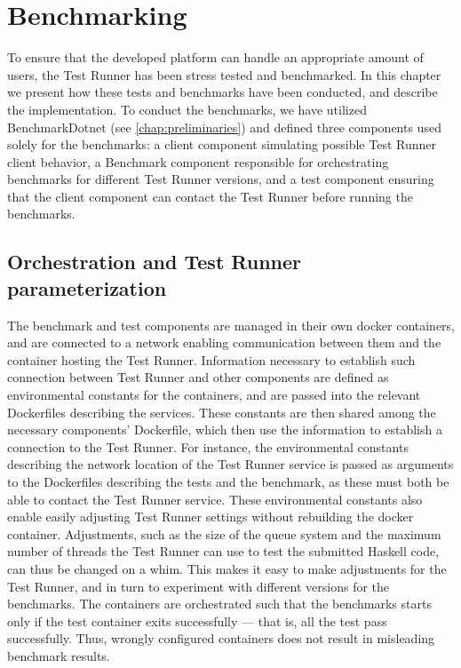 \chapter{Benchmarking} \label{chap:Benchmarking}
To ensure that the developed platform can handle an appropriate amount of users, the Test Runner has been stress tested and benchmarked.
In this chapter we present how these tests and benchmarks have been conducted, and describe the implementation. To conduct the benchmarks, we have utilized BenchmarkDotnet (see \ref{chap:preliminaries}) and defined three components used solely for the benchmarks:
a client component simulating possible Test Runner client behavior, a Benchmark component responsible for orchestrating benchmarks for different Test Runner versions, and a test component ensuring that the client component can contact the Test Runner before running the benchmarks.

\section{Orchestration and Test Runner parameterization}
The benchmark and test components are managed in their own docker containers, and are connected to a network enabling communication between them and the container hosting the Test Runner. 
Information necessary to establish such connection between Test Runner and other components are defined as environmental constants for the containers, and are passed into the relevant Dockerfiles describing the services.
These constants are then shared among the necessary components' Dockerfile, which then use the information to establish a connection to the Test Runner.
For instance, the environmental constants describing the network location of the Test Runner service is passed as arguments to the Dockerfiles describing the tests and the benchmark, as these must both be able to contact the Test Runner service.
These environmental constants also enable easily adjusting Test Runner settings without rebuilding the docker container.
Adjustments, such as the size of the queue system and the maximum number of threads the Test Runner can use to test the submitted Haskell code, can thus be changed on a whim.
This makes it easy to make adjustments for the Test Runner, and in turn to experiment with different versions for the benchmarks.  
The containers are orchestrated such that the benchmarks starts only if the test container exits successfully --- that is, all the test pass successfully. Thus, wrongly configured containers does not result in misleading benchmark results.


